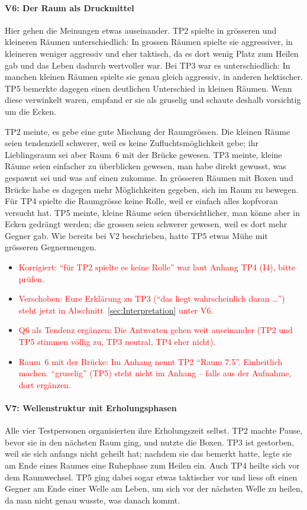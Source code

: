 \documentclass[../Main.tex]{subfiles}
\begin{document}
\paragraph{V6: Der Raum als Druckmittel}
Hier gehen die Meinungen etwas auseinander. TP2 spielte in grösseren und kleineren Räumen unterschiedlich: In grossen Räumen spielte sie aggressiver, in kleineren weniger aggressiv und eher taktisch, da es dort wenig Platz zum Heilen gab und das Leben dadurch wertvoller war. Bei TP3 war es unterschiedlich: In manchen kleinen Räumen spielte sie genau gleich aggressiv, in anderen hektischer. TP5 bemerkte dagegen einen deutlichen Unterschied in kleinen Räumen. Wenn diese verwinkelt waren, empfand er sie als gruselig und schaute deshalb vorsichtig um die Ecken.

TP2 meinte, es gebe eine gute Mischung der Raumgrössen. Die kleinen Räume seien tendenziell schwerer, weil es keine Zufluchtsmöglichkeit gebe; ihr Lieblingsraum sei aber Raum~6 mit der Brücke gewesen. TP3 meinte, kleine Räume seien einfacher zu überblicken gewesen, man habe direkt gewusst, was gespawnt sei und was auf einen zukomme. In grösseren Räumen mit Boxen und Brücke habe es dagegen mehr Möglichkeiten gegeben, sich im Raum zu bewegen. Für TP4 spielte die Raumgrösse keine Rolle, weil er einfach alles kopfvoran versucht hat. TP5 meinte, kleine Räume seien übersichtlicher, man könne aber in Ecken gedrängt werden; die grossen seien schwerer gewesen, weil es dort mehr Gegner gab. Wie bereits bei V2 beschrieben, hatte TP5 etwas Mühe mit grösseren Gegnermengen.

\begin{itemize}[leftmargin=1.5cm]
    \item \textcolor{red}{Korrigiert: \enquote{für TP2 spielte es keine Rolle} war laut Anhang TP4 (I4), bitte prüfen.}
    \item \textcolor{red}{Verschoben: Eure Erklärung zu TP3 (\enquote{das liegt wahrscheinlich daran \ldots}) steht jetzt in Abschnitt~\ref{sec:Interpretation} unter V6.}
    \item \textcolor{red}{Q6 als Tendenz ergänzen: Die Antworten gehen weit auseinander (TP2 und TP5 stimmen völlig zu, TP3 neutral, TP4 eher nicht).}
    \item \textcolor{red}{Raum~6 mit der Brücke: Im Anhang nennt TP2 \enquote{Raum 7.5}. Einheitlich machen. \enquote{gruselig} (TP5) steht nicht im Anhang -- falls aus der Aufnahme, dort ergänzen.}
\end{itemize}

\paragraph{V7: Wellenstruktur mit Erholungsphasen}
Alle vier Testpersonen organisierten ihre Erholungszeit selbst. TP2 machte Pause, bevor sie in den nächsten Raum ging, und nutzte die Boxen. TP3 ist gestorben, weil sie sich anfangs nicht geheilt hat; nachdem sie das bemerkt hatte, legte sie am Ende eines Raumes eine Ruhephase zum Heilen ein. Auch TP4 heilte sich vor dem Raumwechsel. TP5 ging dabei sogar etwas taktischer vor und liess oft einen Gegner am Ende einer Welle am Leben, um sich vor der nächsten Welle zu heilen, da man nicht genau wusste, was danach kommt.
\end{document}
